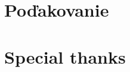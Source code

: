\thispagestyle{empty}

\vspace*{\fill}

\ifx\FIITlagEN\undefined
	\section*{Poďakovanie}
\else
	\section*{Special thanks}
\fi

\lipsum[1]

\emptypage
